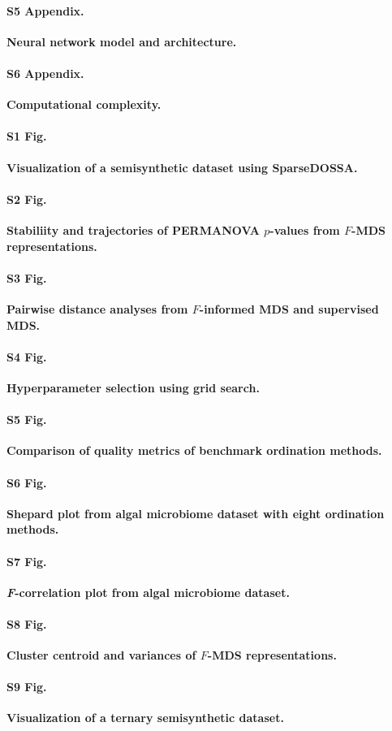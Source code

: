 \documentclass[10pt,letterpaper]{article}
\newcommand{\1}{{\rm 1}\kern-0.24em{\rm I}}
\begin{document}
\paragraph*{S5 Appendix.}
\label{sec:app5_rev}
{\bf Neural network model and architecture.}

\paragraph*{S6 Appendix.}
\label{sec:app6_rev}
{\bf Computational complexity.}

\paragraph*{S1 Fig.}
\label{fig:sim_data_vis}
{\bf Visualization of a semisynthetic dataset using SparseDOSSA.}

\paragraph*{S2 Fig.}
\label{fig:sim_fmds_track}
{\bf Stabiliity and trajectories of PERMANOVA $p$-values from $F$-MDS representations.}

\paragraph*{S3 Fig.}
\label{fig:sim_fmds_smds}
\textbf{Pairwise distance analyses from $F$-informed MDS and supervised MDS.}

\paragraph*{S4 Fig.}
\label{fig:fmds_gridsearch}
\textbf{Hyperparameter selection using grid search.}

\paragraph*{S5 Fig.}
\label{fig:sim_eval_all}
\textbf{Comparison of quality metrics of benchmark ordination methods.}

\paragraph*{S6 Fig.}
\label{fig:shepard_alga_all}
\textbf{Shepard plot from algal microbiome dataset with eight ordination methods.}

\paragraph*{S7 Fig.}
\label{fig:f_corr_alga_all}
\textbf{\textit{F}-correlation plot from algal microbiome dataset.}

\paragraph*{S8 Fig.}
\label{fig:fmds_rep_analysis}
\textbf{Cluster centroid and variances of $F$-MDS representations.} 

\paragraph*{S9 Fig.}
\label{fig:sim_ternary_vis}
\textbf{Visualization of a ternary semisynthetic dataset.}
\end{document}
